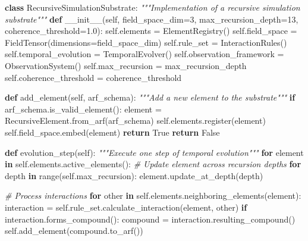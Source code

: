\documentclass[
]{article}
\newenvironment{Shaded}{}{}
\newcommand{\BuiltInTok}[1]{\textcolor[rgb]{0.00,0.50,0.00}{#1}}
\newcommand{\CommentTok}[1]{\textcolor[rgb]{0.38,0.63,0.69}{\textit{#1}}}
\newcommand{\ControlFlowTok}[1]{\textcolor[rgb]{0.00,0.44,0.13}{\textbf{#1}}}
\newcommand{\DecValTok}[1]{\textcolor[rgb]{0.25,0.63,0.44}{#1}}
\newcommand{\FloatTok}[1]{\textcolor[rgb]{0.25,0.63,0.44}{#1}}
\newcommand{\FunctionTok}[1]{\textcolor[rgb]{0.02,0.16,0.49}{#1}}
\newcommand{\KeywordTok}[1]{\textcolor[rgb]{0.00,0.44,0.13}{\textbf{#1}}}
\newcommand{\NormalTok}[1]{#1}
\newcommand{\OperatorTok}[1]{\textcolor[rgb]{0.40,0.40,0.40}{#1}}
\newcommand{\VariableTok}[1]{\textcolor[rgb]{0.10,0.09,0.49}{#1}}
\begin{document}
\begin{Shaded}
\begin{Highlighting}[]
\KeywordTok{class}\NormalTok{ RecursiveSimulationSubstrate:}
    \CommentTok{"""Implementation of a recursive simulation substrate"""}
    \KeywordTok{def} \FunctionTok{\_\_init\_\_}\NormalTok{(}\VariableTok{self}\NormalTok{, field\_space\_dim}\OperatorTok{=}\DecValTok{3}\NormalTok{, max\_recursion\_depth}\OperatorTok{=}\DecValTok{13}\NormalTok{, coherence\_threshold}\OperatorTok{=}\FloatTok{1.0}\NormalTok{):}
        \VariableTok{self}\NormalTok{.elements }\OperatorTok{=}\NormalTok{ ElementRegistry()}
        \VariableTok{self}\NormalTok{.field\_space }\OperatorTok{=}\NormalTok{ FieldTensor(dimensions}\OperatorTok{=}\NormalTok{field\_space\_dim)}
        \VariableTok{self}\NormalTok{.rule\_set }\OperatorTok{=}\NormalTok{ InteractionRules()}
        \VariableTok{self}\NormalTok{.temporal\_evolution }\OperatorTok{=}\NormalTok{ TemporalEvolver()}
        \VariableTok{self}\NormalTok{.observation\_framework }\OperatorTok{=}\NormalTok{ ObservationSystem()}
        \VariableTok{self}\NormalTok{.max\_recursion }\OperatorTok{=}\NormalTok{ max\_recursion\_depth}
        \VariableTok{self}\NormalTok{.coherence\_threshold }\OperatorTok{=}\NormalTok{ coherence\_threshold}

    \KeywordTok{def}\NormalTok{ add\_element(}\VariableTok{self}\NormalTok{, arf\_schema):}
        \CommentTok{"""Add a new element to the substrate"""}
        \ControlFlowTok{if}\NormalTok{ arf\_schema.is\_valid\_element():}
\NormalTok{            element }\OperatorTok{=}\NormalTok{ RecursiveElement.from\_arf(arf\_schema)}
            \VariableTok{self}\NormalTok{.elements.register(element)}
            \VariableTok{self}\NormalTok{.field\_space.embed(element)}
            \ControlFlowTok{return} \VariableTok{True}
        \ControlFlowTok{return} \VariableTok{False}

    \KeywordTok{def}\NormalTok{ evolution\_step(}\VariableTok{self}\NormalTok{):}
        \CommentTok{"""Execute one step of temporal evolution"""}
        \ControlFlowTok{for}\NormalTok{ element }\KeywordTok{in} \VariableTok{self}\NormalTok{.elements.active\_elements():}
            \CommentTok{\# Update element across recursion depths}
            \ControlFlowTok{for}\NormalTok{ depth }\KeywordTok{in} \BuiltInTok{range}\NormalTok{(}\VariableTok{self}\NormalTok{.max\_recursion):}
\NormalTok{                element.update\_at\_depth(depth)}

            \CommentTok{\# Process interactions}
            \ControlFlowTok{for}\NormalTok{ other }\KeywordTok{in} \VariableTok{self}\NormalTok{.elements.neighboring\_elements(element):}
\NormalTok{                interaction }\OperatorTok{=} \VariableTok{self}\NormalTok{.rule\_set.calculate\_interaction(element, other)}
                \ControlFlowTok{if}\NormalTok{ interaction.forms\_compound():}
\NormalTok{                    compound }\OperatorTok{=}\NormalTok{ interaction.resulting\_compound()}
                    \VariableTok{self}\NormalTok{.add\_element(compound.to\_arf())}


\end{Highlighting}
\end{Shaded}
\end{document}
